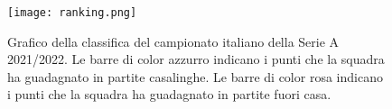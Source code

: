 \begin{figure}[h]
	\begin{center}
		\texttt{[image: ranking.png]}
		\caption{Grafico della classifica del campionato italiano della Serie A 2021/2022. Le barre di color azzurro indicano i punti che la squadra ha guadagnato in partite casalinghe. Le barre di color rosa indicano i punti che la squadra ha guadagnato in partite fuori casa.
		} 
		\label{fig:ranking}
	\end{center}
\end{figure}
\begin{comment}[!htb]%
	
	\renewcommand{\arraystretch}{1.7}
	\centering
	\begin{tabular}{c c c c}
		\hline	
		
		\textbf{Posizione} & \textbf{Squadra} & \textbf{Punti} & \textbf{ \% punti in casa}  \\	
		\hline			
		1 & Milan & 86 & 0.47\\
		2 & Inter & 84 & 0.54\\
		3 & Napoli & 79 & 0.46\\
		4 & Juventus & 70 & 0.50\\
		5 & Lazio & 64 & 0.56\\
		6 & Roma & 63 & 0.57\\
		7 & Fiorentina & 62 & 0.66\\
		8 & Atalanta & 59 & 0.33\\
		9 & Hellas Verona & 53 & 0.57\\
		10 & Torino & 50 & 0.58\\
		11 & Sassuolo & 50 & 0.48\\
		12 & Udinese & 47 & 0.53\\
		13 & Bologna & 46 & 0.61\\
		14 & Empoli & 41 & 0.42\\
		15 & Sampdoria & 36 & 0.58\\
		16 & Spezia & 36 & 0.50\\
		17 & Salernitana & 31 & 0.48\\
		18 & Genoa & 30 & 0.50\\
		19 & Cagliari & 28 & 0.61\\
		20 & Venezia & 27 & 0.52\\
		\hline
		& & & \\
		
	\end{tabular} \hbox{}
	
	\caption{La tabella mostra i punti guadagnati da ogni squadra con il loro piazzamento. Inoltre viene mostrata la percentuale di punti guadagnati in casa.} \label{tab:ranking}
\end{comment}


